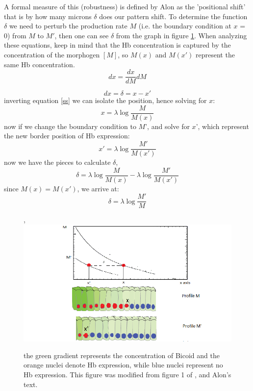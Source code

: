   A formal measure of this (robustness) is defined by Alon as the 'positional shift' that is by how many microns $\delta $ does our pattern shift.  To determine the function $\delta $ we need to perturb the production rate $M$ (i.e. the boundary condition at $x$ = 0) from $M$ to $M'$, then one can see $\delta $ from the graph in figure \ref{shift}.  When analyzing these equations, keep in mind that the Hb concentration is captured by the concentration of the morphogen $[M]$, so $M(x)$ and $M(x')$ represent the same Hb concentration.
  \begin{equation}\label{inverse}
    d x = \frac{d x }{d M} dM
  \end{equation}

\begin{equation}\label{solvex}
    dx = \delta = x - x'
  \end{equation}
  inverting equation \eqref{ss} we can isolate the position, hence solving for $x$:
  \begin{equation}\label{}
   x = \lambda \log{\frac{M}{M(x)}}
  \end{equation}
  now if we change the boundary condition to $M$', and solve for $x$', which represent the new border position of Hb expression:
  \begin{equation}\label{}
  x' = \lambda \log{\frac{M'}{M(x')}}
  \end{equation}
  now we have the pieces to calculate $\delta$,
  \begin{equation}\label{}
     \delta = \lambda \log{\frac{M}{M(x)} }- \lambda \log{\frac{M'}{M(x')}}
  \end{equation}
  since $M(x) = M(x')$, we arrive at:
  \begin{equation}\label{}
  \delta =  \lambda\log{\frac{M'}{M}}
  \end{equation}

\begin{figure},
  \includegraphics[width=1\textwidth]{sourcegraph}\\
  \caption{the green gradient represents the concentration of Bicoid and the orange nuclei denote Hb expression, while blue nuclei represent no Hb expression.  This figure was modified from figure 1 of \cite{pmid20066104}, and Alon's text\cite{designp}.}\label{shift}
\end{figure}

